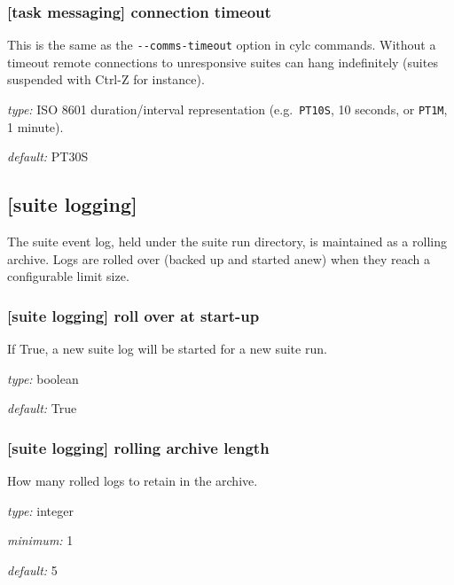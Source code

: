 \subsubsection[connection timeout]{[task messaging] \textrightarrow connection timeout}

This is the same as the \lstinline=--comms-timeout= option in cylc
commands. Without a timeout remote connections to unresponsive
suites can hang indefinitely (suites suspended with Ctrl-Z for instance).

\begin{myitemize}
\item {\em type:} ISO 8601 duration/interval representation (e.g.\ 
\lstinline=PT10S=, 10 seconds, or \lstinline=PT1M=, 1 minute).
\item {\em default:} PT30S
\end{myitemize}

\subsection{[suite logging]}

The suite event log, held under the suite run directory, is maintained
as a rolling archive. Logs are rolled over (backed up and started anew)
when they reach a configurable limit size.

\subsubsection[roll over at start-up]{[suite logging] \textrightarrow roll over at start-up}

If True, a new suite log will be started for a new suite run.

\begin{myitemize}
\item {\em type:} boolean
\item {\em default:} True
\end{myitemize}

\subsubsection[rolling archive length]{[suite logging] \textrightarrow rolling archive length}

How many rolled logs to retain in the archive.

\begin{myitemize}
\item {\em type:} integer
\item {\em minimum:} 1
\item {\em default:} 5
\end{myitemize}

